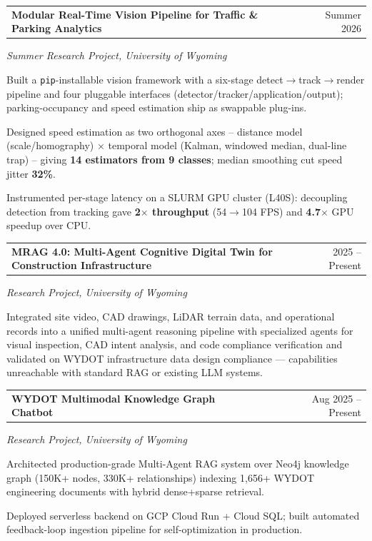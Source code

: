 \documentclass[a4paper,10pt]{article}
\makeatletter
\newenvironment{jobshort}[2]
    {
    \begin{tabularx}{\linewidth}{@{}l X r@{}}
    \textbf{#1} & \hfill & #2 \\[1.5pt]
    \end{tabularx}
    }
    {}
\makeatother
\begin{document}
\begin{jobshort}{Modular Real-Time Vision Pipeline for Traffic \& Parking Analytics}{Summer 2026}
\textit{Summer Research Project, University of Wyoming}
\begin{itemize}[itemsep=-5pt]
{
    \item Built a \texttt{pip}-installable vision framework with a six-stage detect$\rightarrow$track$\rightarrow$render pipeline and four pluggable interfaces (detector/tracker/application/output); parking-occupancy and speed estimation ship as swappable plug-ins.
    \item Designed speed estimation as two orthogonal axes -- distance model (scale/homography) $\times$ temporal model (Kalman, windowed median, dual-line trap) -- giving \textbf{14 estimators from 9 classes}; median smoothing cut speed jitter \textbf{32\%}.
    \item Instrumented per-stage latency on a SLURM GPU cluster (L40S): decoupling detection from tracking gave \textbf{2$\times$ throughput} (54$\rightarrow$104 FPS) and \textbf{4.7$\times$} GPU speedup over CPU.
}
\end{itemize}
\end{jobshort}

\begin{jobshort}{MRAG 4.0: Multi-Agent Cognitive Digital Twin for Construction Infrastructure}{2025 -- Present}
\textit{Research Project, University of Wyoming}
\begin{itemize}[itemsep=-5pt]
{
    \item Integrated site video, CAD drawings, LiDAR terrain data, and operational records into a unified multi-agent reasoning pipeline with specialized agents for visual inspection, CAD intent analysis, and code compliance verification and validated on WYDOT infrastructure data design compliance — capabilities unreachable with standard RAG or existing LLM systems.
}
\end{itemize}
\end{jobshort}

\vspace{4pt}
\begin{jobshort}{WYDOT Multimodal Knowledge Graph Chatbot}{Aug 2025 -- Present}
\textit{Research Project, University of Wyoming}
\begin{itemize}[itemsep=-5pt]
{
    \item Architected production-grade Multi-Agent RAG system over Neo4j knowledge graph (150K+ nodes, 330K+ relationships) indexing 1,656+ WYDOT engineering documents with hybrid dense+sparse retrieval.
    \item Deployed serverless backend on GCP Cloud Run + Cloud SQL; built automated feedback-loop ingestion pipeline for self-optimization in production.
}
\end{itemize}
\end{jobshort}
\end{document}
